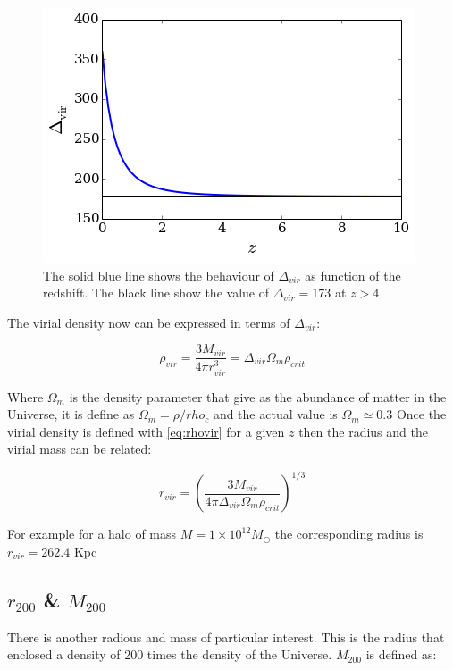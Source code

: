 \documentclass[a4paper, 12pt]{article} %
\begin{document}
\begin{figure}[H]\label{fig:dvir}
\centering
\includegraphics[scale=0.5]{deltavir.png}
\caption{The solid blue line shows the behaviour of $\Delta_{vir}$ 
as function of the redshift. The black line show the value of 
$\Delta_{vir}=173$ at $z>4$}
\end{figure}

The virial density now can be expressed in terms of $\Delta_{vir}$: 

\begin{equation}\label{eq:rhovir}
\rho_{vir} = \frac{3M_{vir}}{4 \pi r_{vir}^3} = \Delta_{vir} \Omega_m \rho_{crit} 
\end{equation}

Where $\Omega_m$ is the density parameter that give as the abundance of matter in the 
Universe, it is define as $\Omega_m = \rho / rho_c$ and the actual value is $\Omega_m \simeq 0.3$  
Once the virial density is defined with \ref{eq:rhovir} for a given $z$ then the radius 
and the virial mass can be related:

\begin{equation}
r_{vir} = \left( \frac{3M_{vir}}{4 \pi \Delta_{vir} \Omega_m \rho_{crit} } \right )^{1/3}
\end{equation}

For example for a halo of mass $M = 1 \times 10^{12}M_{\odot}$ the corresponding radius 
is $r_{vir}=262.4$ Kpc

\subsection{$r_{200}$ \& $M_{200}$}

There is another radious and mass of particular interest. This is the radius that enclosed a density
of 200 times the density of the Universe. $M_{200}$ is defined as:  
\end{document}

